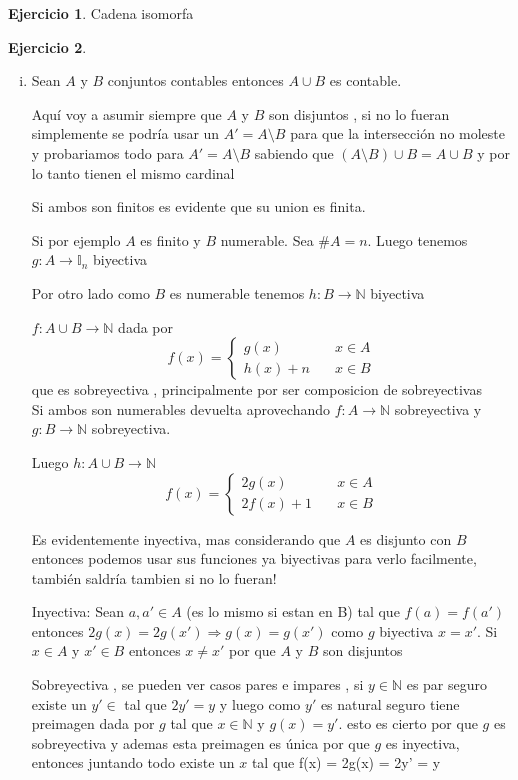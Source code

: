 \documentclass[12pt]{article}
\newcommand{\I}{\mathbb{I}}
\newcommand{\N}{\mathbb{N}}
\newcommand{\Ra}{\Rightarrow}
\newcommand{\ra}{\rightarrow}
\theoremstyle{definition}
\newtheorem{ej}{Ejercicio}
\begin{document}
\begin{ej}
Cadena isomorfa
\end{ej}
\begin{ej}

\begin{enumerate}[i.]
  \item Sean $A$ y $B$ conjuntos contables entonces $A \cup B$ es contable.
    
    Aquí voy a asumir siempre que $A$ y $B$ son disjuntos , si no lo fueran simplemente se podría usar un $A' = A \setminus B$ para que la intersección no moleste y probariamos todo para $A' = A \setminus B$ sabiendo que $(A \setminus B ) \cup B = A \cup B$ y por lo tanto tienen el mismo cardinal
      
      Si ambos son finitos es evidente que su union es finita.
      
      Si por ejemplo $A$ es finito y $B$ numerable. Sea $\# A = n$. Luego tenemos $g: A \ra \I_{n}$ biyectiva

      Por otro lado como $B$ es numerable tenemos $h: B \ra \N$ biyectiva

      $f : A \cup B \ra \N$ dada por 
$$
f(x) = \left\{
        \begin{array}{ll}
	  g(x)  & \quad x \in A \\
	  h(x) + n  & \quad x \in B 
        \end{array}
    \right.
$$
que es sobreyectiva , principalmente por ser composicion de sobreyectivas\\

Si ambos son numerables devuelta aprovechando $f: A \ra \N$ sobreyectiva y $g: B \ra \N$ sobreyectiva.

Luego $h: A \cup B \ra \N$
$$
f(x) = \left\{
        \begin{array}{ll}
	  2g(x)  & \quad x \in A \\
	  2f(x) + 1  & \quad x \in B 
        \end{array}
    \right.
$$

Es evidentemente inyectiva, mas considerando que $A$ es disjunto con $B$ entonces podemos usar sus funciones ya biyectivas para verlo facilmente, también saldría tambien si no lo fueran!

Inyectiva: Sean $a,a' \in A$ (es lo mismo si estan en B) tal que $f(a) = f(a')$ entonces $2g(x) = 2g(x') \Ra g(x) = g(x')$ como $g$ biyectiva $x = x'$. Si $x \in A$ y $x' \in B$ entonces $x \neq x'$ por que $A$ y $B$ son disjuntos

Sobreyectiva , se pueden ver casos pares e impares , si $y \in \N$ es par seguro existe un $y' \in$ tal que $2y' = y$ y luego como $y'$ es natural seguro tiene preimagen dada por $g$ tal que $x \in \N$ y $g(x) = y'$. esto es cierto por que $g$ es sobreyectiva y ademas esta preimagen es única por que $g$ es inyectiva, entonces juntando todo existe un $x$ tal que f(x) = 2g(x) = 2y' = y
   

\end{enumerate}
\end{ej}
\end{document}
